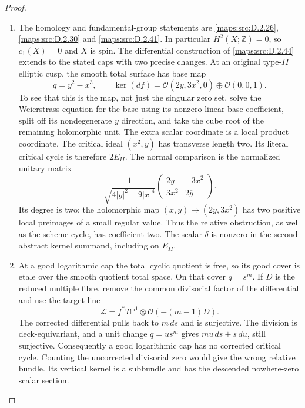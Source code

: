 \begin{proof}
\begin{enumerate}[label=\arabic*.,leftmargin=*]
\item The homology and fundamental-group statements are \ref{maps:src:D.2.26},
\ref{maps:src:D.2.30} and \ref{maps:src:D.2.41}. In particular $H^2(X;\mathbb Z)=0$, so
$c_1(X)=0$ and $X$ is spin. The differential construction of
\ref{maps:src:D.2.44} extends to the stated caps with two precise changes.
At an original type-$II$ elliptic cusp, the smooth total
surface has base map
\[
 q=y^2-x^3,\qquad
 \ker(df)=\mathcal O(2y,3x^2,0)\oplus\mathcal O(0,0,1).
                                                               \tag{D45.4}\label{maps:eq:D45.4}
\]
To see that this is the map, not just the singular zero set,
solve the Weierstrass equation for the base using its nonzero
linear base coefficient, split off its nondegenerate $y$
direction, and take the cube root of the remaining holomorphic
unit. The extra scalar coordinate is a local product coordinate.
The critical ideal $(x^2,y)$ has transverse length two.
Its literal critical cycle is therefore $2E_{II}$.
The normal comparison is the normalized unitary matrix
\[
 \frac1{\sqrt{4|y|^2+9|x|^4}}
 \begin{pmatrix}2y&-3\overline{x}^{2}\\3x^2&2\overline y\end{pmatrix}.
                                                               \tag{D45.5}\label{maps:eq:D45.5}
\]
Its degree is two: the holomorphic map $(x,y)\mapsto(2y,3x^2)$
has two positive local preimages of a small regular value.
Thus the relative obstruction, as well as the scheme cycle,
has coefficient two. The scalar $\delta$ is nonzero in the
second abstract kernel summand, including on $E_{II}$.

\item At a good logarithmic cap the total cyclic quotient is free,
so its good cover is etale over the smooth quotient total
space. On that cover $q=s^m$. If $D$ is the reduced multiple
fibre, remove the common divisorial factor of the differential
and use the target line
\[
 \mathcal L=f^*T\mathbb P^1\otimes
                   \mathcal O(-(m-1)D).                     \tag{D45.6}\label{maps:eq:D45.6}
\]
The corrected differential pulls back to $m\,ds$ and is
surjective. The division is deck-equivariant, and a unit
change $q=u s^m$ gives $mu\,ds+s\,du$, still surjective.
Consequently a good logarithmic cap has no corrected critical
cycle. Counting the uncorrected divisorial zero would give
the wrong relative bundle. Its vertical kernel is a subbundle
and has the descended nowhere-zero scalar section.


\end{enumerate}
\end{proof}
